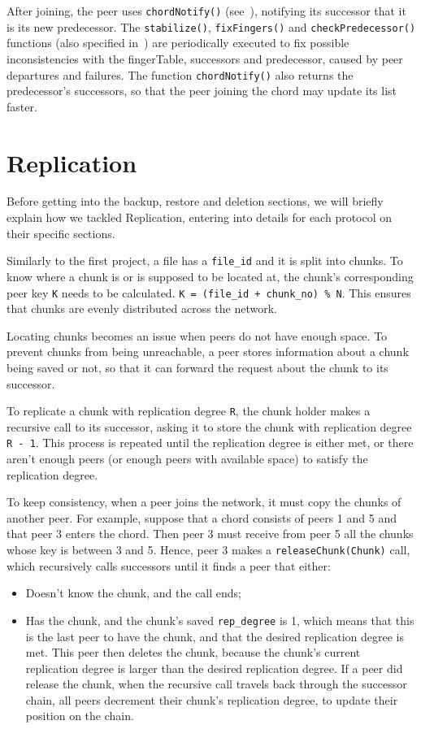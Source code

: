 \documentclass[11pt]{article}
\begin{document}
After joining, the peer uses \verb|chordNotify()| (see~\cite{chord_paper}), notifying its successor that it is its new predecessor. The \verb|stabilize()|, \verb|fixFingers()| and \verb|checkPredecessor()| functions (also specified in~\cite{chord_paper}) are periodically executed to fix possible inconsistencies with the fingerTable, successors and predecessor, caused by peer departures and failures. The function \verb|chordNotify()| also returns the predecessor's successors, so that the peer joining the chord may update its list faster. 

\section{Replication}
Before getting into the backup, restore and deletion sections, we will briefly explain how we tackled Replication, entering into details for each protocol on their specific sections. 

Similarly to the first project, a file has a \verb|file_id| and it is split into chunks. To know where a chunk is or is supposed to be located at, the chunk's corresponding peer key \verb|K| needs to be calculated. \verb|K = (file_id + chunk_no) % N|. This ensures that chunks are evenly distributed across the network.

Locating chunks becomes an issue when peers do not have enough space. To prevent chunks from being unreachable, a peer stores information about a chunk being saved or not, so that it can forward the request about the chunk to its successor.  

To replicate a chunk with replication degree \verb|R|, the chunk holder makes a recursive call to its successor, asking it to store the chunk with replication degree \verb|R - 1|. This process is repeated until the replication degree is either met, or there aren't enough peers (or enough peers with available space) to satisfy the replication degree.

To keep consistency, when a peer joins the network, it must copy the chunks of another peer. For example, suppose that a chord consists of peers 1 and 5 and that peer 3 enters the chord. Then peer 3 must receive from peer 5 all the chunks whose key is between 3 and 5. Hence, peer 3 makes a \verb|releaseChunk(Chunk)| call, which recursively calls successors until it finds a peer that either:
\begin{itemize}
\item Doesn't know the chunk, and the call ends;
\item Has the chunk, and the chunk's saved \verb|rep_degree| is 1, which means that this is the last peer to have the chunk, and that the desired replication degree is met. This peer then deletes the chunk, because the chunk's current replication degree is larger than the desired replication degree. If a peer did release the chunk, when the recursive call travels back through the successor chain, all peers decrement their chunk's replication degree, to update their position on the chain.
\end{itemize}
\end{document}
